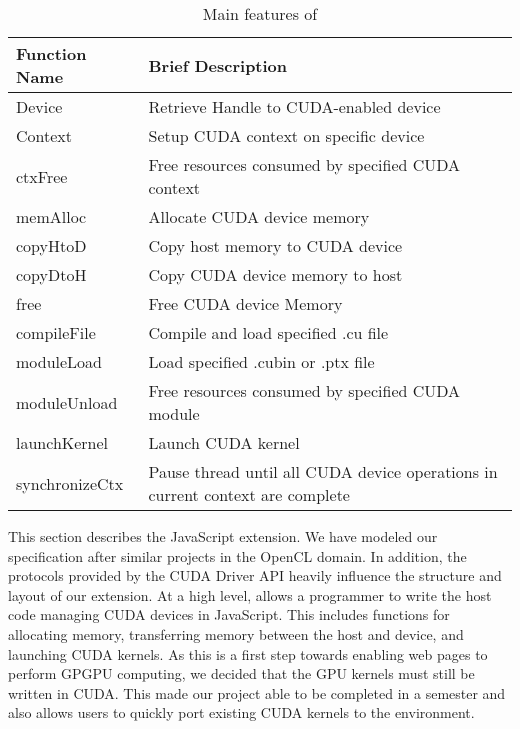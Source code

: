
\begin{table}
\begin{center}
\begin{tabular}{| l | p{5.5cm} | }
\hline
Function Name & Brief Description \\
\hline
Device & Retrieve Handle to CUDA-enabled device \\
\hline
Context & Setup CUDA context on specific device \\
\hline
ctxFree & Free resources consumed by specified CUDA context\\
\hline
memAlloc & Allocate CUDA device memory \\
\hline
copyHtoD  & Copy host memory to CUDA device \\
\hline
copyDtoH & Copy CUDA device memory to host \\
\hline
free & Free CUDA device Memory \\
\hline
compileFile & Compile and load specified .cu file \\
\hline
moduleLoad & Load specified .cubin or .ptx file \\
\hline
moduleUnload & Free resources consumed by specified CUDA module\\
\hline
launchKernel & Launch CUDA kernel\\
\hline
synchronizeCtx & Pause thread until all CUDA device operations in current context are complete \\
\hline
\end{tabular}
\end{center}
\caption{Main features of \name}
\label{webcudaSpec}
\end{table}

This section describes the \name JavaScript extension. We have modeled our
specification after similar projects \cite{webCL, safariCL, nokiaCL, chromeCL} in
the OpenCL domain.  In addition, the protocols provided by the CUDA Driver API
\cite{cudaAPI} heavily influence the structure and layout of our extension. At a
high level, \name allows a programmer to write the host code managing CUDA
devices in JavaScript. This includes functions for allocating memory,
transferring memory between the host and device, and launching CUDA kernels. As
this is a first step towards enabling web pages to perform GPGPU computing, we
decided that the GPU kernels must still be written in CUDA. This made our
project able to be completed in a semester and also allows users to quickly port
existing CUDA kernels to the \name environment.


